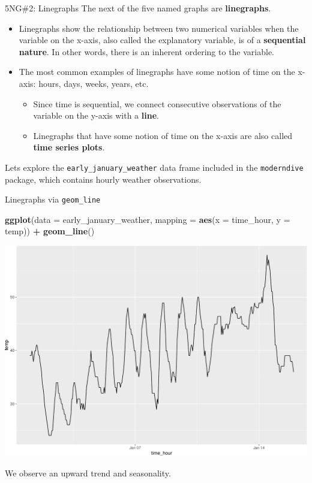 \documentclass[
  ignorenonframetext,
]{beamer}
\newenvironment{Shaded}{\begin{snugshade}}{\end{snugshade}}
\newcommand{\AttributeTok}[1]{\textcolor[rgb]{0.13,0.29,0.53}{#1}}
\newcommand{\FunctionTok}[1]{\textcolor[rgb]{0.13,0.29,0.53}{\textbf{#1}}}
\newcommand{\NormalTok}[1]{#1}
\newcommand{\SpecialCharTok}[1]{\textcolor[rgb]{0.81,0.36,0.00}{\textbf{#1}}}
\providecommand{\tightlist}{%
  \setlength{\itemsep}{0pt}\setlength{\parskip}{0pt}}
\begin{document}
\begin{frame}[fragile]{5NG\#2: Linegraphs}
\protect\hypertarget{ng2-linegraphs}{}
The next of the five named graphs are \textbf{linegraphs}.

\begin{itemize}
\item
  Linegraphs show the relationship between two numerical variables when
  the variable on the x-axis, also called the explanatory variable, is
  of a \textbf{sequential nature}. In other words, there is an inherent
  ordering to the variable.
\item
  The most common examples of linegraphs have some notion of time on the
  x-axis: hours, days, weeks, years, etc.

  \begin{itemize}
  \tightlist
  \item
    Since time is sequential, we connect consecutive observations of the
    variable on the y-axis with a \textbf{line}.
  \item
    Linegraphs that have some notion of time on the x-axis are also
    called \textbf{time series plots}.
  \end{itemize}
\end{itemize}

Lets explore the \texttt{early\_january\_weather} data frame included in
the \texttt{moderndive} package, which contains hourly weather
observations.
\end{frame}

\begin{frame}[fragile]{Linegraphs via \texttt{geom\_line}}
\protect\hypertarget{linegraphs-via-geom_line}{}
\tiny

\begin{Shaded}
\begin{Highlighting}[]
\FunctionTok{ggplot}\NormalTok{(}\AttributeTok{data =}\NormalTok{ early\_january\_weather, }
       \AttributeTok{mapping =} \FunctionTok{aes}\NormalTok{(}\AttributeTok{x =}\NormalTok{ time\_hour, }\AttributeTok{y =}\NormalTok{ temp)) }\SpecialCharTok{+}
  \FunctionTok{geom\_line}\NormalTok{()}
\end{Highlighting}
\end{Shaded}

\begin{center}\includegraphics[width=0.7\linewidth,height=0.5\textheight]{Week2_files/figure-beamer/unnamed-chunk-25-1} \end{center}
\normalsize

We observe an upward trend and seasonality.
\end{frame}
\end{document}
